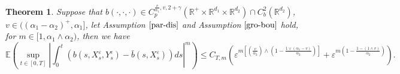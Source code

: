 \documentclass[11pt,reqno]{amsart}
\newtheorem{theorem}{\indent Theorem}[section]
\numberwithin{equation}{section}
\newcommand{\mb}{\mathbb}
\begin{document}
\begin{theorem}\label{T52}
Suppose that $b(\cdot,\cdot,\cdot)\in C_{p}^{\frac{v}{\alpha_{1}},v,2+\gamma}(\mb{R}^{+}\times\mathbb{R}^{d_{1}}\times\mathbb{R}^{d_{2}})\cap C_b^{2}(\mathbb{R}^{d_{2}})$, $v\in((\alpha_{1}-\alpha_{2})^{+},\alpha_{1}]$, let Assumption $\ref{par-dis}$ and Assumption $\ref{gro-bou}$  hold, for $m\in [1,\alpha_{1}\wedge\alpha_{2})$, then we have 
\begin{equation}\label{5.44}
	\mathbb{E}\left( \sup_{t\in [0,T]}\left| \int_{0}^{t}\left( b(s,X_{s}^{\varepsilon},Y_{s}^{\varepsilon})-\bar{b}(s,X_{s}^{\varepsilon})\right)ds\right|^{m} \right)  \leq C_{T,m}\left(\varepsilon^{m\left[ \left( \frac{v}{\alpha_{2}}\right) \wedge \left( 1-\frac{1\vee(\alpha_{1}-v)}{\alpha_{2}}\right) \right] }+\varepsilon^{m(1-\frac{1-(1\wedge v)}{\alpha_{2}})}\right).
\end{equation}
\end{theorem}
\end{document}

